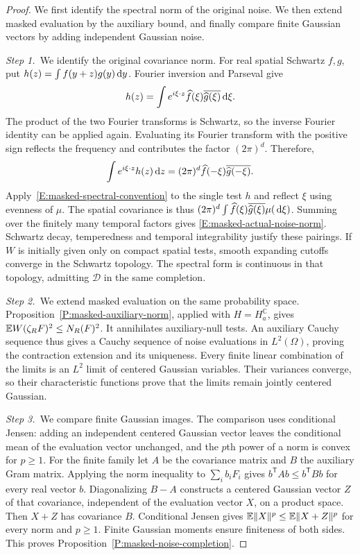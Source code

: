 \begin{proof}
  We first identify the spectral norm of the original noise. We then extend
  masked evaluation by the auxiliary bound, and finally compare finite
  Gaussian vectors by adding independent Gaussian noise.

  \medskip
  \noindent\textit{Step 1.~}We identify the original covariance norm.
  For real spatial Schwartz $f,g$, put $h(z) = \int f(y+z)g(y)\,\mathrm{d} y$. Fourier
  inversion and Parseval give
  \[
    h(z) = \int e^{i\xi\cdot z}\widehat{f}(\xi)
    \overline{\widehat{g}(\xi)}\,\mathrm{d}\xi.
  \]
  The product of the two Fourier transforms is Schwartz, so the inverse
  Fourier identity can be applied again. Evaluating its Fourier transform with
  the positive sign reflects the frequency and contributes the factor
  $(2\pi)^d$.
  Therefore,
  \[
    \int e^{i\xi\cdot z}h(z)\,\mathrm{d} z
    = (2\pi)^d\widehat{f}(-\xi)\overline{\widehat{g}(-\xi)}.
  \]
  Apply~\eqref{E:masked-spectral-convention} to the single test $h$ and reflect
  $\xi$ using evenness of $\mu$. The spatial covariance is thus
  $(2\pi)^d\int\widehat{f}(\xi)\overline{\widehat{g}(\xi)}\mu(\,\mathrm{d}\xi)$. Summing
  over the finitely many temporal factors gives
  \eqref{E:masked-actual-noise-norm}. Schwartz decay, temperedness and temporal
  integrability justify these pairings. If $W$ is initially given only on
  compact spatial tests, smooth expanding cutoffs converge in the Schwartz
  topology. The spectral form is continuous in that topology, admitting
  $\mathcal{D}$ in the same completion.

  \medskip
  \noindent\textit{Step 2.~}We extend masked evaluation on the same
  probability space.
  Proposition~\ref{P:masked-auxiliary-norm}, applied with $H =
  H_a^{\mathbb{C}}$, gives $\mathbb{E} W(\zeta_RF)^2 \le N_R(F)^2$. It annihilates
  auxiliary-null tests. An auxiliary Cauchy sequence thus gives a Cauchy
  sequence of noise evaluations in $L^2(\Omega)$, proving the contraction
  extension and its uniqueness. Every finite linear combination of the limits is
  an $L^2$ limit of centered Gaussian variables. Their variances converge, so
  their characteristic functions prove that the limits remain jointly centered
  Gaussian.



  \medskip
  \noindent\textit{Step 3.~}We compare finite Gaussian images.
  The comparison uses conditional Jensen: adding an independent centered
  Gaussian vector leaves the conditional mean of the evaluation vector
  unchanged, and the $p$th power of a norm is convex for $p\ge1$.
  For the finite family let $A$ be the covariance matrix and $B$ the auxiliary
  Gram matrix. Applying the norm inequality to $\sum_i b_iF_i$ gives
  $b^{\mathsf{T}}Ab \le b^{\mathsf{T}}Bb$ for every real vector $b$.
  Diagonalizing $B-A$ constructs a centered Gaussian vector $Z$ of that
  covariance, independent of the evaluation vector $X$, on a product space. Then
  $X+Z$ has covariance $B$. Conditional Jensen gives $\mathbb{E}\|X\|^p \le \mathbb{E}\|X+Z\|^p$
  for every norm and $p \ge 1$. Finite Gaussian moments ensure finiteness of
  both sides. This proves Proposition~\ref{P:masked-noise-completion}.
\end{proof}

